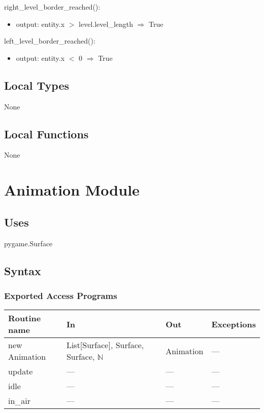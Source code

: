 \documentclass[12pt]{article}
\begin{document}
right\_level\_border\_reached():
\begin{itemize}
    \item output: entity.x $>$ level.level\_length $\Rightarrow$ True
\end{itemize}

left\_level\_border\_reached():
\begin{itemize}
    \item output: entity.x $<$ 0 $\Rightarrow$ True
\end{itemize}

\subsection* {Local Types}

None

\subsection* {Local Functions}

None
\newpage

\section* {Animation Module}

\subsection* {Uses}
pygame.Surface
\subsection* {Syntax}

\subsubsection* {Exported Access Programs}

\begin{tabular}{| l | l | l | l |}
\hline
\textbf{Routine name} & \textbf{In} & \textbf{Out} & \textbf{Exceptions}\\
\hline
new Animation & List[Surface], Surface, Surface, $\mathbb{N}$ & Animation & ---\\
\hline
update & --- & --- & ---\\
\hline
idle & --- & --- & ---\\
\hline
in\_air & --- & --- & ---\\
\hline
\end{tabular}
\end{document}
